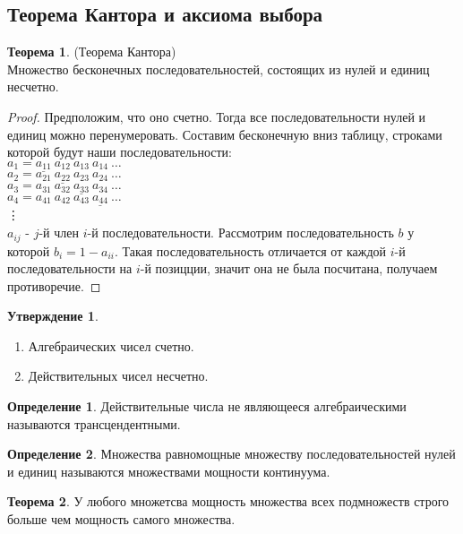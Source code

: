\documentclass[a4paper, 12pt]{article}
\newcommand\tab[1][.5cm]{\hspace*{#1}}
\theoremstyle{definition}
\newtheorem*{definition}{Определение}
\newtheorem*{theorem}{Теорема}
\newtheorem*{statement}{Утверждение}
\begin{document}
        \subsection{Теорема Кантора и аксиома выбора}
        \begin{theorem} (Теорема Кантора)\\
            Множество бесконечных последовательностей, состоящих из нулей и единиц несчетно.
        \end{theorem} 
        \begin{proof}
            Предположим, что оно счетно. Тогда все последовательности нулей и единиц можно перенумеровать. Составим бесконечную вниз таблицу, строками которой будут наши последовательности:\\
            \tab[6cm]$a_1=\underline{a_{11}}\ a_{12}\ a_{13}\ a_{14}\ \dots$\\
            \tab[6cm]$a_2=a_{21}\ \underline{a_{22}}\ a_{23}\ a_{24}\ \dots$\\
            \tab[6cm]$a_3=a_{31}\ a_{32}\ \underline{a_{33}}\ a_{34}\ \dots$\\
            \tab[6cm]$a_4=a_{41}\ a_{42}\ a_{43}\ \underline{a_{44}}\ \dots$\\
            \tab[6cm]\vdots\\
            $a_{ij}$ - $j$-й член $i$-й последовательности. Рассмотрим последовательность $b$ у которой $b_i=1-a_{ii}$. Такая последовательность отличается от каждой $i$-й последовательности на $i$-й позицции, значит она не была посчитана, получаем противоречие.
        \end{proof}
        \begin{statement}
            \begin{enumerate}\tab
                \item Алгебраических чисел счетно.
                \item Действительных чисел несчетно.
            \end{enumerate}
        \end{statement}
        \begin{definition}
            Действительные числа не являющееся алгебраическими называются трансцендентными.
        \end{definition} 
        \begin{definition}
            Множества равномощные множеству последовательностей нулей и единиц называются множествами мощности континуума.
        \end{definition} 
        \begin{theorem}
            У любого множетсва мощность множества всех подмножеств строго больше чем мощность самого множества.
        \end{theorem}
\end{document}

